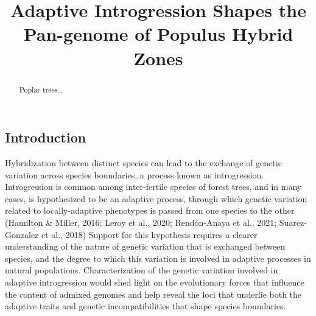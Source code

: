 \documentclass[
]{agujournal2019}
\begin{document}
\title{Adaptive Introgression Shapes the Pan-genome of Populus Hybrid
Zones}




\begin{abstract}
Poplar trees\ldots{}
\end{abstract}





\subsection{Introduction}\label{introduction}

Hybridization between distinct species can lead to the exchange of
genetic variation across species boundaries, a process known as
introgression. Introgression is common among inter-fertile species of
forest trees, and in many cases, is hypothesized to be an adaptive
process, through which genetic variation related to locally-adaptive
phenotypes is passed from one species to the other (Hamilton \& Miller,
2016; Leroy et al., 2020; Rendón-Anaya et al., 2021; Suarez-Gonzalez et
al., 2018) Support for this hypothesis requires a clearer understanding
of the nature of genetic variation that is exchanged between species,
and the degree to which this variation is involved in adaptive processes
in natural populations. Characterization of the genetic variation
involved in adaptive introgression would shed light on the evolutionary
forces that influence the content of admixed genomes and help reveal the
loci that underlie both the adaptive traits and genetic
incompatibilities that shape species boundaries.
\end{document}
